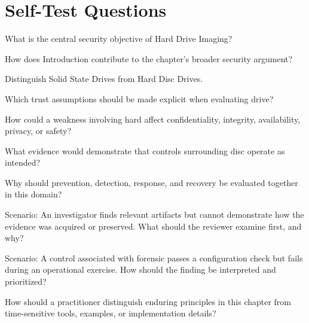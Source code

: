 \documentclass[11pt,letterpaper]{article}
\begin{document}
\section*{Self-Test Questions}
\begin{CornellRecallList}
\item What is the central security objective of Hard Drive Imaging?
\item How does Introduction contribute to the chapter's broader security argument?
\item Distinguish Solid State Drives from Hard Disc Drives.
\item Which trust assumptions should be made explicit when evaluating drive?
\item How could a weakness involving hard affect confidentiality, integrity, availability, privacy, or safety?
\item What evidence would demonstrate that controls surrounding disc operate as intended?
\item Why should prevention, detection, response, and recovery be evaluated together in this domain?
\item Scenario: An investigator finds relevant artifacts but cannot demonstrate how the evidence was acquired or preserved. What should the reviewer examine first, and why?
\item Scenario: A control associated with forensic passes a configuration check but fails during an operational exercise. How should the finding be interpreted and prioritized?
\item How should a practitioner distinguish enduring principles in this chapter from time-sensitive tools, examples, or implementation details?
\end{CornellRecallList}
\end{document}
